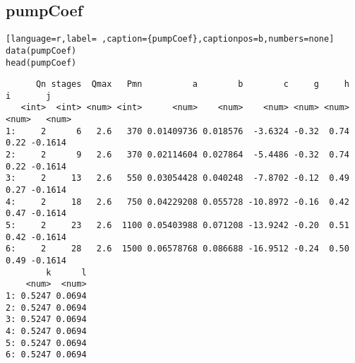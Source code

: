 \subsection{pumpCoef}
\label{sec:org4f7ef1e}
\label{subsec:pumpcoef}
\begin{lstlisting}[language=r,label= ,caption={pumpCoef},captionpos=b,numbers=none]
data(pumpCoef)
head(pumpCoef)
\end{lstlisting}

\begin{verbatim}
      Qn stages  Qmax   Pmn          a        b        c     g     h     i       j
   <int>  <int> <num> <int>      <num>    <num>    <num> <num> <num> <num>   <num>
1:     2      6   2.6   370 0.01409736 0.018576  -3.6324 -0.32  0.74  0.22 -0.1614
2:     2      9   2.6   370 0.02114604 0.027864  -5.4486 -0.32  0.74  0.22 -0.1614
3:     2     13   2.6   550 0.03054428 0.040248  -7.8702 -0.12  0.49  0.27 -0.1614
4:     2     18   2.6   750 0.04229208 0.055728 -10.8972 -0.16  0.42  0.47 -0.1614
5:     2     23   2.6  1100 0.05403988 0.071208 -13.9242 -0.20  0.51  0.42 -0.1614
6:     2     28   2.6  1500 0.06578768 0.086688 -16.9512 -0.24  0.50  0.49 -0.1614
        k      l
    <num>  <num>
1: 0.5247 0.0694
2: 0.5247 0.0694
3: 0.5247 0.0694
4: 0.5247 0.0694
5: 0.5247 0.0694
6: 0.5247 0.0694
\end{verbatim}
